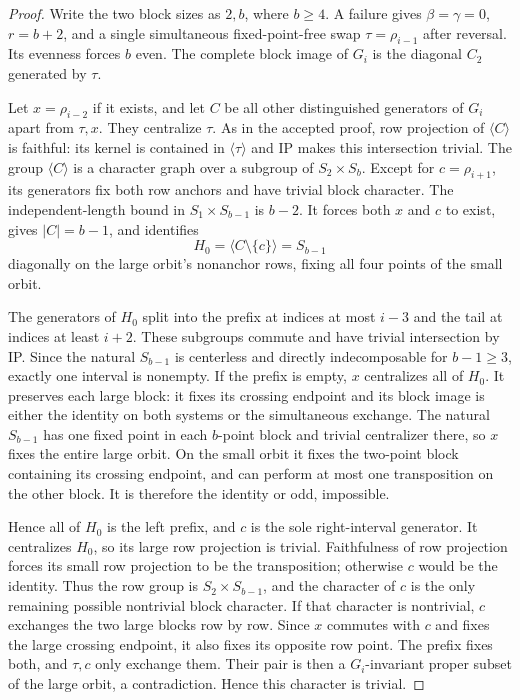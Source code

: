 \documentclass[11pt,a4paper]{article}
\newcommand{\gen}[1]{\langle#1\rangle}
\begin{document}
\begin{proof}
Write the two block sizes as $2,b$, where $b\geq4$.
A failure gives $\beta=\gamma=0$, $r=b+2$, and a single
simultaneous fixed-point-free swap $\tau=\rho_{i-1}$ after
reversal. Its evenness forces $b$ even. The complete block
image of $G_i$ is the diagonal $C_2$ generated by $\tau$.

Let $x=\rho_{i-2}$ if it exists, and let $C$ be all other
distinguished generators of $G_i$ apart from $\tau,x$.
They centralize $\tau$. As in the accepted proof, row projection
of $\gen C$ is faithful: its kernel is contained in $\gen\tau$
and IP makes this intersection trivial. The group $\gen C$
is a character graph over a subgroup of $S_2\times S_b$.
Except for $c=\rho_{i+1}$, its generators fix both row anchors
and have trivial block character. The independent-length bound
in $S_1\times S_{b-1}$ is $b-2$. It forces both $x$ and $c$
to exist, gives $|C|=b-1$, and identifies
\[
 H_0=\gen{C\setminus\{c\}}=S_{b-1}
\]
diagonally on the large orbit's nonanchor rows, fixing all four
points of the small orbit.

The generators of $H_0$ split into the prefix at indices at
most $i-3$ and the tail at indices at least $i+2$.
These subgroups commute and have trivial intersection by IP.
Since the natural $S_{b-1}$ is centerless and directly
indecomposable for $b-1\geq3$, exactly one interval is nonempty.
If the prefix is empty, $x$ centralizes all of $H_0$.
It preserves each large block: it fixes its crossing endpoint
and its block image is either the identity on both systems or
the simultaneous exchange. The natural $S_{b-1}$ has one fixed
point in each $b$-point block and trivial centralizer there,
so $x$ fixes the entire large orbit. On the small orbit it
fixes the two-point block containing its crossing endpoint,
and can perform at most one transposition on the other block.
It is therefore the identity or odd, impossible.

Hence all of $H_0$ is the left prefix, and $c$ is the sole
right-interval generator. It centralizes $H_0$, so its large
row projection is trivial. Faithfulness of row projection
forces its small row projection to be the transposition;
otherwise $c$ would be the identity. Thus the row group is
$S_2\times S_{b-1}$, and the character of $c$ is the only
remaining possible nontrivial block character.
If that character is nontrivial, $c$ exchanges the two large
blocks row by row. Since $x$ commutes with $c$ and fixes the
large crossing endpoint, it also fixes its opposite row point.
The prefix fixes both, and $\tau,c$ only exchange them.
Their pair is then a $G_i$-invariant proper subset of the large
orbit, a contradiction. Hence this character is trivial.


\end{proof}
\end{document}
